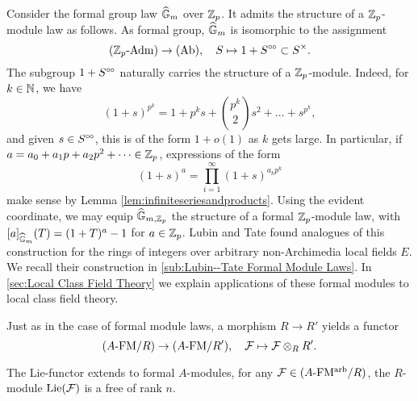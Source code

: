 \documentclass[../main.tex]{subfiles}
\begin{document}
\begin{xpl}
  Consider the formal group law $\widehat{\mathbb{G}}_m$ over $\mathbb{Z}_p$. It 
  admits the structure of a $\mathbb{Z}_p$-module law as follows. 
  As formal group, $\widehat{\mathbb{G}}_m$ is isomorphic to the assignment
  \begin{equation*}
    {({\mathbb{Z}_p}\textnormal-\allowbreak\mathrm{Adm})} \to {(\mathrm{Ab})}, \quad S \mapsto 1 + S^{\circ \hspace{-0.5pt} \circ} \subset S^\times.
  \end{equation*}
  The subgroup $1 + S^{\circ \hspace{-0.5pt} \circ}$ naturally carries the structure of a $\mathbb{Z}_p$-module.
  Indeed, for $k \in \mathbb{N}$, we have
  \begin{equation*}
    (1+s)^{p^k} = 1 + p^ks + \binom{p^k}2 s^2 + \dots + s^{p^k},
  \end{equation*}
  and given $s \in S^{\circ \hspace{-0.5pt} \circ}$, this is of the form $1+ o(1)$ as $k$ gets large. 
  In particular, if $a = a_0 + a_1 p + a_2p^2 + \dots \in \mathbb{Z}_p$, expressions of  the form
  \begin{equation*}
    (1+s)^a = \prod_{i = 1}^\infty (1+s)^{a_k p^k}
  \end{equation*}
  make sense by Lemma \ref{lem:infiniteseriesandproducts}. 
  Using the evident coordinate, we may equip
  $\widehat{\mathbb{G}}_{m,\mathbb{Z}_p}$ the structure of a formal $\mathbb{Z}_p$-module law, with
  $[a]_{\widehat{\mathbb{G}}_m}(T) = (1+T)^a -1$ for $a \in \mathbb{Z}_p$. 
  Lubin and Tate found analogues of this construction for the rings of integers 
  over arbitrary non-Archimedia local fields $E$. We recall their construction in 
  \cref{sub:Lubin--Tate Formal Module Laws}. In  \ref{sec:Local Class
  Field Theory} we explain applications of these formal modules to local class
  field theory.
\end{xpl}

Just as in the case of formal 
module laws, a morphism $R \to R'$ yields a functor 
\begin{equation*} 
  {({A}\textnormal-\allowbreak\mathrm{FM}/{R})} \to {({A}\textnormal-\allowbreak\mathrm{FM}/{R'})}, \quad \mathcal{F} \mapsto \mathcal{F} \otimes_R R'.
\end{equation*}

The Lie-functor extends to formal $A$-modules, for any $\mathcal{F} \in {({A}\textnormal-\allowbreak\mathrm{FM^{arb}}/{R})}$,
the $R$-module $\operatorname{Lie}(\mathcal{F})$ is a free of rank $n$.
\end{document}
